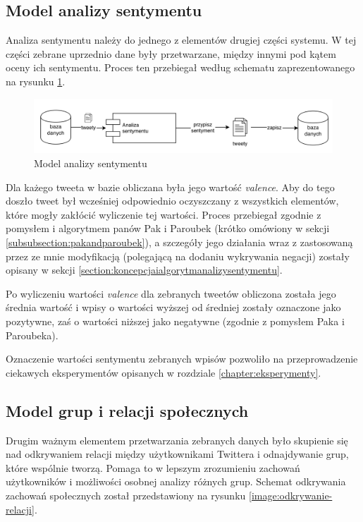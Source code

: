 \subsection{Model analizy sentymentu}
\label{subsection:modelanalizysentymentu}

Analiza sentymentu należy do jednego z elementów drugiej części systemu.
W tej części zebrane uprzednio dane były przetwarzane, między innymi pod kątem
oceny ich sentymentu. Proces ten przebiegał według schematu
zaprezentowanego na rysunku \ref{image:model-analizy-sentymentu}.

\begin{figure}[ht!]
\centering
\includegraphics[width=160mm]{img/model-analizy-sentymentu.png}
\caption{Model analizy sentymentu}
\label{image:model-analizy-sentymentu}
\end{figure}


Dla każego tweeta w bazie obliczana była jego wartość \textit{valence}.
Aby do tego doszło tweet był wcześniej odpowiednio oczyszczany z wszystkich
elementów, które mogły zakłócić wyliczenie tej wartości. Proces przebiegał
zgodnie z pomysłem i algorytmem panów Pak i Paroubek (krótko omówiony w sekcji
\ref{subsubsection:pakandparoubek}), a szczegóły jego działania wraz z
zastosowaną przez ze mnie modyfikacją (polegającą na dodaniu wykrywania negacji)
zostały opisany w sekcji \ref{section:koncepcjaialgorytmanalizysentymentu}.

Po wyliczeniu wartości \textit{valence} dla zebranych tweetów obliczona została
jego średnia wartość i wpisy o wartości wyższej od średniej zostały oznaczone
jako pozytywne, zaś o wartości niższej jako negatywne (zgodnie z pomysłem Paka
i Paroubeka).

Oznaczenie wartości sentymentu zebranych wpisów pozwoliło na przeprowadzenie
ciekawych eksperymentów opisanych w rozdziale \ref{chapter:eksperymenty}.


\subsection{Model grup i relacji społecznych}
\label{subsection:modelgrupirelacjispolecznych}
Drugim ważnym elementem przetwarzania zebranych danych było skupienie się nad
odkrywaniem relacji między użytkownikami Twittera i odnajdywanie grup, które
wspólnie tworzą. Pomaga to w lepszym zrozumieniu zachowań użytkowników i
możliwości osobnej analizy różnych grup. Schemat odkrywania zachowań społecznych
został przedstawiony na rysunku \ref{image:odkrywanie-relacji}.


